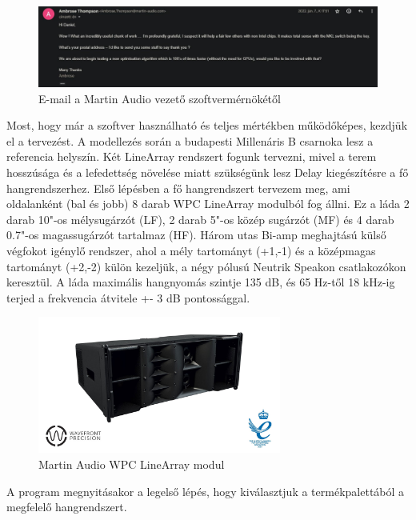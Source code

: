 \begin{figure}[H]
	\centering
	\includegraphics[width=\textwidth, keepaspectratio]{figures/ambrose_email.jpg}
	\caption{E-mail a Martin Audio vezető szoftvermérnökétől}
	\label{fig:ambrose_email}
\end{figure}
Most, hogy már a szoftver használható és teljes mértékben működőképes, kezdjük el a tervezést.
A modellezés során a budapesti Millenáris B csarnoka lesz a referencia helyszín. Két LineArray rendszert fogunk
tervezni, mivel a terem hosszúsága és a lefedettség növelése miatt szükségünk lesz Delay kiegészítésre a fő hangrendszerhez.
Első lépésben a fő hangrendszert tervezem meg, ami oldalanként (bal és jobb) 8 darab WPC LineArray modulból fog állni.
Ez a láda 2 darab 10"-os mélysugárzót (LF), 2 darab 5"-os közép sugárzót (MF) és 4 darab 0.7"-os magassugárzót tartalmaz (HF).
Három utas Bi-amp meghajtású külső végfokot igénylő rendszer, ahol a mély tartományt (+1,-1) és a középmagas tartományt (+2,-2) külön kezeljük,
a négy pólusú Neutrik Speakon csatlakozókon keresztül.
A láda maximális hangnyomás szintje 135 dB, és 65 Hz-től 18 kHz-ig terjed a frekvencia átvitele +- 3 dB pontossággal.~\cite{WPCUSERGUIDE}
\begin{figure}[H]
	\centering
	\includegraphics[width=80mm, keepaspectratio]{figures/wpc_front_view.jpg}
	\caption{Martin Audio WPC LineArray modul}\label{fig:wpc}
\end{figure}
A program megnyitásakor a legelső lépés, hogy kiválasztjuk a termékpalettából a megfelelő hangrendszert.
